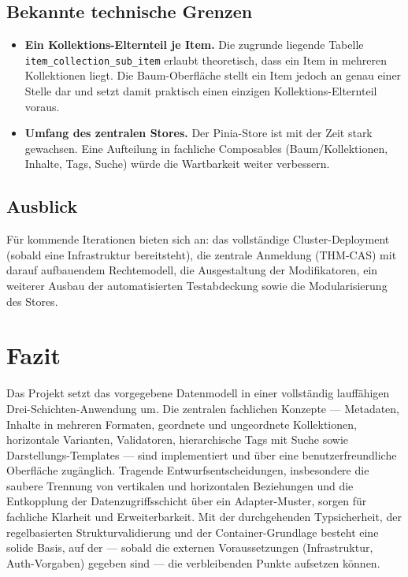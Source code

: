 \documentclass[11pt,a4paper]{article}
\begin{document}
\subsection{Bekannte technische Grenzen}
\begin{itemize}
  \item \textbf{Ein Kollektions-Elternteil je Item.} Die zugrunde liegende
  Tabelle \texttt{item\_collection\_sub\_item} erlaubt theoretisch, dass ein Item
  in mehreren Kollektionen liegt. Die Baum-Oberfläche stellt ein Item jedoch an
  genau einer Stelle dar und setzt damit praktisch einen einzigen
  Kollektions-Elternteil voraus.
  \item \textbf{Umfang des zentralen Stores.} Der Pinia-Store ist mit der Zeit
  stark gewachsen. Eine Aufteilung in fachliche Composables (Baum/Kollektionen,
  Inhalte, Tags, Suche) würde die Wartbarkeit weiter verbessern.
\end{itemize}

\subsection{Ausblick}
Für kommende Iterationen bieten sich an: das vollständige Cluster-Deployment
(sobald eine Infrastruktur bereitsteht), die zentrale Anmeldung (THM-CAS) mit
darauf aufbauendem Rechtemodell, die Ausgestaltung der Modifikatoren, ein
weiterer Ausbau der automatisierten Testabdeckung sowie die Modularisierung des
Stores.

\section{Fazit}

Das Projekt setzt das vorgegebene Datenmodell in einer vollständig lauffähigen
Drei-Schichten-Anwendung um. Die zentralen fachlichen Konzepte --- Metadaten,
Inhalte in mehreren Formaten, geordnete und ungeordnete Kollektionen, horizontale
Varianten, Validatoren, hierarchische Tags mit Suche sowie Darstellungs-Templates
--- sind implementiert und über eine benutzerfreundliche Oberfläche zugänglich.
Tragende Entwurfsentscheidungen, insbesondere die saubere Trennung von vertikalen
und horizontalen Beziehungen und die Entkopplung der Datenzugriffsschicht über
ein Adapter-Muster, sorgen für fachliche Klarheit und Erweiterbarkeit. Mit der
durchgehenden Typsicherheit, der regelbasierten Strukturvalidierung und der
Container-Grundlage besteht eine solide Basis, auf der --- sobald die externen
Voraussetzungen (Infrastruktur, Auth-Vorgaben) gegeben sind --- die verbleibenden
Punkte aufsetzen können.
\end{document}
